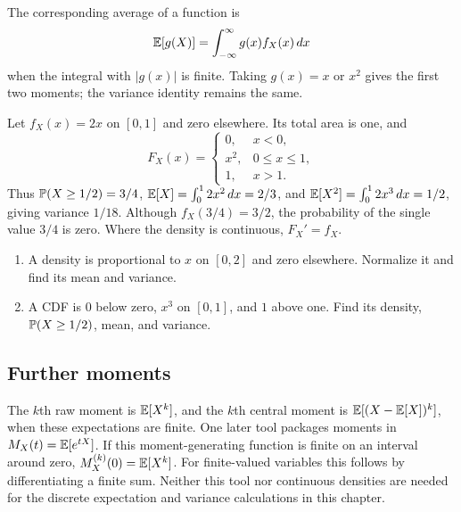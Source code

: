 The corresponding average of a function is
\[
 \E[g(X)]=\int_{-\infty}^{\infty}g(x)f_X(x)\,dx
\]
when the integral with $|g(x)|$ is finite. Taking $g(x)=x$ or $x^2$
gives the first two moments; the variance identity remains the same.

\begin{example}
Let $f_X(x)=2x$ on $[0,1]$ and zero elsewhere. Its total area is one, and
\[
 F_X(x)=
 \begin{cases}0,&x<0,\\x^2,&0\le x\le1,\\1,&x>1.\end{cases}
\]
Thus $\P(X\ge1/2)=3/4$, $\E[X]=\int_0^1 2x^2\,dx=2/3$, and
$\E[X^2]=\int_0^1 2x^3\,dx=1/2$, giving variance $1/18$.
Although $f_X(3/4)=3/2$, the probability of the single value $3/4$ is zero.
Where the density is continuous, $F_X'=f_X$.
\end{example}

\begin{exercisebox}[title={Later practice: continuous models}]
\begin{enumerate}[start=19]
 \item A density is proportional to $x$ on $[0,2]$ and zero elsewhere.
 Normalize it and find its mean and variance. 
 \item A CDF is $0$ below zero, $x^3$ on $[0,1]$, and $1$ above one.
 Find its density, $\P(X\ge1/2)$, mean, and variance. 
\end{enumerate}
\end{exercisebox}

\subsection*{Further moments}
The $k$th raw moment is $\E[X^k]$, and the $k$th central moment is
$\E[(X-\E[X])^k]$, when these expectations are finite.
One later tool packages moments in $M_X(t)=\E[e^{tX}]$.
If this moment-generating function is finite on an interval around zero,
$M_X^{(k)}(0)=\E[X^k]$.
For finite-valued variables this follows by differentiating a finite sum.
Neither this tool nor continuous densities are needed for the discrete
expectation and variance calculations in this chapter.

